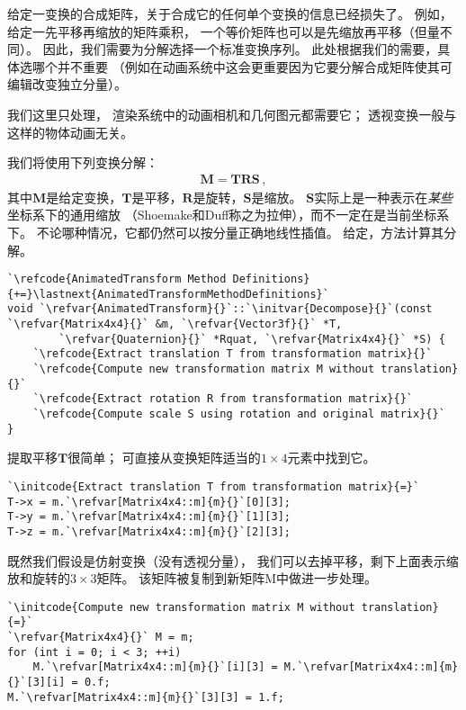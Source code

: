 给定一变换的合成矩阵，关于合成它的任何单个变换的信息已经损失了。
例如，给定一先平移再缩放的矩阵乘积，
一个等价矩阵也可以是先缩放再平移（但量不同）。
因此，我们需要为分解选择一个标准变换序列。
此处根据我们的需要，具体选哪个并不重要
（例如在动画系统中这会更重要因为它要分解合成矩阵使其可编辑改变独立分量）。

我们这里只处理，
渲染系统中的动画相机和几何图元都需要它；
透视变换一般与这样的物体动画无关。

我们将使用下列变换分解：
\begin{align}\label{eq:2.9}
    \bm M=\bm T\bm R\bm S\, ,
\end{align}
其中$\bm M$是给定变换，$\bm T$是平移，$\bm R$是旋转，$\bm S$是缩放。
$\bm S$实际上是一种表示在\emph{某些}坐标系下的通用缩放
（Shoemake和Duff称之为拉伸），而不一定在是当前坐标系下。
不论哪种情况，它都仍然可以按分量正确地线性插值。
给定，方法计算其分解。
\begin{lstlisting}
`\refcode{AnimatedTransform Method Definitions}{+=}\lastnext{AnimatedTransformMethodDefinitions}`
void `\refvar{AnimatedTransform}{}`::`\initvar{Decompose}{}`(const `\refvar{Matrix4x4}{}` &m, `\refvar{Vector3f}{}` *T,
        `\refvar{Quaternion}{}` *Rquat, `\refvar{Matrix4x4}{}` *S) {
    `\refcode{Extract translation T from transformation matrix}{}`
    `\refcode{Compute new transformation matrix M without translation}{}`
    `\refcode{Extract rotation R from transformation matrix}{}`
    `\refcode{Compute scale S using rotation and original matrix}{}`
}
\end{lstlisting}

提取平移$\bm T$很简单；
可直接从变换矩阵适当的$1\times4$元素中找到它。
\begin{lstlisting}
`\initcode{Extract translation T from transformation matrix}{=}`
T->x = m.`\refvar[Matrix4x4::m]{m}{}`[0][3];
T->y = m.`\refvar[Matrix4x4::m]{m}{}`[1][3];
T->z = m.`\refvar[Matrix4x4::m]{m}{}`[2][3];
\end{lstlisting}

既然我们假设是仿射变换（没有透视分量），
我们可以去掉平移，剩下上面表示缩放和旋转的$3\times3$矩阵。
该矩阵被复制到新矩阵{\ttfamily M}中做进一步处理。
\begin{lstlisting}
`\initcode{Compute new transformation matrix M without translation}{=}`
`\refvar{Matrix4x4}{}` M = m;
for (int i = 0; i < 3; ++i)
    M.`\refvar[Matrix4x4::m]{m}{}`[i][3] = M.`\refvar[Matrix4x4::m]{m}{}`[3][i] = 0.f;
M.`\refvar[Matrix4x4::m]{m}{}`[3][3] = 1.f;
\end{lstlisting}

